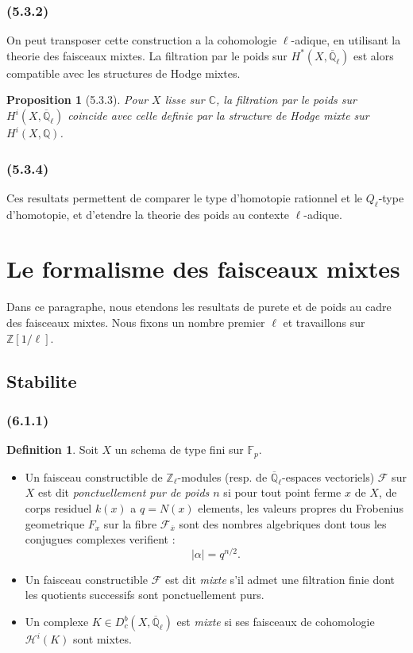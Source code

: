 \documentclass[12pt,a4paper]{article}
\theoremstyle{plain}
\newtheorem{proposition}[theorem]{Proposition}
\theoremstyle{definition}
\newtheorem{definition}[theorem]{Definition}
\theoremstyle{remark}
\newcommand{\bbZ}{\mathbb{Z}}
\newcommand{\bbQ}{\mathbb{Q}}
\newcommand{\bbC}{\mathbb{C}}
\newcommand{\scrF}{\mathscr{F}}
\newcommand{\scrH}{\mathscr{H}}
\newcommand{\Zl}{\mathbb{Z}_\ell}
\newcommand{\Qlb}{\overline{\mathbb{Q}}_\ell}
\newcommand{\Fp}{\mathbb{F}_p}
\begin{document}
\subsubsection*{\textup{(5.3.2)}}

On peut transposer cette construction a la cohomologie $\ell$-adique, en utilisant la theorie des faisceaux mixtes. La filtration par le poids sur $H^*(X, \Qlb)$ est alors compatible avec les structures de Hodge mixtes.

\begin{proposition}[5.3.3]
Pour $X$ lisse sur $\bbC$, la filtration par le poids sur $H^i(X, \Qlb)$ coincide avec celle definie par la structure de Hodge mixte sur $H^i(X, \bbQ)$.
\end{proposition}

\subsubsection*{\textup{(5.3.4)}}

Ces resultats permettent de comparer le type d'homotopie rationnel et le $Q_\ell$-type d'homotopie, et d'etendre la theorie des poids au contexte $\ell$-adique.


\section{Le formalisme des faisceaux mixtes}

Dans ce paragraphe, nous etendons les resultats de purete et de poids au cadre des faisceaux mixtes. Nous fixons un nombre premier $\ell$ et travaillons sur $\bbZ[1/\ell]$.

\subsection{Stabilite}

\subsubsection*{\textup{(6.1.1)}}

\begin{definition}
Soit $X$ un schema de type fini sur $\Fp$.
\begin{itemize}
\item[(a)] Un faisceau constructible de $\Zl$-modules (resp. de $\Qlb$-espaces vectoriels) $\scrF$ sur $X$ est dit \emph{ponctuellement pur de poids $n$} si pour tout point ferme $x$ de $X$, de corps residuel $k(x)$ a $q = N(x)$ elements, les valeurs propres du Frobenius geometrique $F_x$ sur la fibre $\scrF_{\overline{x}}$ sont des nombres algebriques dont tous les conjugues complexes verifient :
\[
|\alpha| = q^{n/2}.
\]
\item[(b)] Un faisceau constructible $\scrF$ est dit \emph{mixte} s'il admet une filtration finie dont les quotients successifs sont ponctuellement purs.
\item[(c)] Un complexe $K \in D_c^b(X, \Qlb)$ est \emph{mixte} si ses faisceaux de cohomologie $\scrH^i(K)$ sont mixtes.
\end{itemize}
\end{definition}
\end{document}
